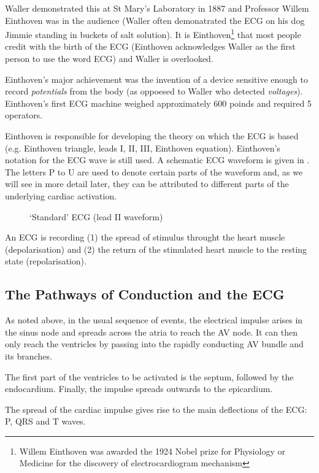 Waller demonstrated this at St Mary's Laboratory in 1887 and Professor Willem
Einthoven was in the audience (Waller often demonatrated the ECG on his dog
Jimmie standing in buckets of salt solution). It is Einthoven\footnote{Willem
  Einthoven was awarded the 1924 Nobel prize for Physiology or Medicine for
  the discovery of electrocardiogram mechanism} that most people credit with
the birth of the ECG (Einthoven acknowledges Waller as the first person to use
the word ECG) and Waller is overlooked.

Einthoven's major achievement was the invention of a device sensitive enough
to record \emph{potentials} from the body (as oppoesed to Waller who detected
\emph{voltages}).  Einthoven's first ECG machine weighed approximately 600
poinds and required 5 operators.

Einthoven is responsible for developing the theory on which the ECG is based
(e.g. Einthoven triangle, leads I, II, III, Einthoven equation). Einthoven's
notation for the ECG wave is still used.  A schematic ECG waveform is given in
.  The letters P to U are used to denote certain parts of the
waveform and, as we will see in more detail later, they can be attributed to
different parts of the underlying cardiac activation.

\begin{figure}[htpb] \centering
  
  \caption{`Standard' ECG (lead II waveform)}
  \label{fig:ECG}
\end{figure}

An ECG is recording (1) the spread of stimulus throught the heart muscle
(depolarisation) and (2) the return of the stimulated heart muscle to the
resting state (repolarisation).

\subsection{The Pathways of Conduction and the ECG}
As noted above, in the usual sequence of events, the electrical impulse arises in the sinus
node and spreads across the atria to reach the AV node. It can then only reach
the ventricles by passing into the rapidly conducting AV bundle and its
branches.

The first part of the ventricles to be activated is the septum, followed by
the endocardium.  Finally, the impulse spreads outwards to the epicardium.

The spread of the cardiac impulse gives rise to the main deflections of the
ECG: P, QRS and T waves.

